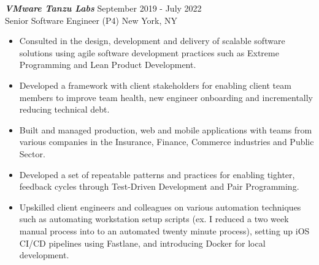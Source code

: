 {\sl \textbf{VMware Tanzu Labs}} \hfill September 2019 - July 2022 \\ Senior Software Engineer (P4) \hfill New York, NY
\begin{itemize}
    \item Consulted in the design, development and delivery of scalable software solutions using agile software development practices such as Extreme Programming and Lean Product Development.
    \item Developed a framework with client stakeholders for enabling client team members to improve team health, new engineer onboarding and incrementally reducing technical debt.
    \item Built and managed production, web and mobile applications with teams from various companies in the Insurance, Finance, Commerce industries and Public Sector.
    \item Developed a set of repeatable patterns and practices for enabling tighter, feedback cycles through Test-Driven Development and Pair Programming.
    \item Upskilled client engineers and colleagues on various automation techniques such as automating workstation setup scripts (ex. I reduced a two week manual process into to an automated twenty minute process), setting up iOS CI/CD pipelines using Fastlane, and introducing Docker for local development.
\end{itemize}
